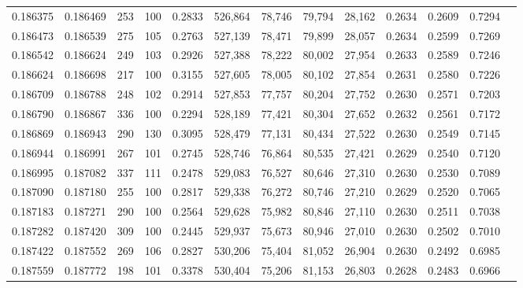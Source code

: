 \begin{tabular}{rrrrrrrrrrrrr}
0.186375 & 0.186469 &   253 & 100 &                                     0.2833 & 526,864 &  78,746 &  79,794 &  28,162 & 0.2634 & 0.2609 & 0.7294 \\
0.186473 & 0.186539 &   275 & 105 &                                     0.2763 & 527,139 &  78,471 &  79,899 &  28,057 & 0.2634 & 0.2599 & 0.7269 \\
0.186542 & 0.186624 &   249 & 103 &                                     0.2926 & 527,388 &  78,222 &  80,002 &  27,954 & 0.2633 & 0.2589 & 0.7246 \\
0.186624 & 0.186698 &   217 & 100 &                                     0.3155 & 527,605 &  78,005 &  80,102 &  27,854 & 0.2631 & 0.2580 & 0.7226 \\
0.186709 & 0.186788 &   248 & 102 &                                     0.2914 & 527,853 &  77,757 &  80,204 &  27,752 & 0.2630 & 0.2571 & 0.7203 \\
0.186790 & 0.186867 &   336 & 100 &                                     0.2294 & 528,189 &  77,421 &  80,304 &  27,652 & 0.2632 & 0.2561 & 0.7172 \\
0.186869 & 0.186943 &   290 & 130 &                                     0.3095 & 528,479 &  77,131 &  80,434 &  27,522 & 0.2630 & 0.2549 & 0.7145 \\
0.186944 & 0.186991 &   267 & 101 &                                     0.2745 & 528,746 &  76,864 &  80,535 &  27,421 & 0.2629 & 0.2540 & 0.7120 \\
0.186995 & 0.187082 &   337 & 111 &                                     0.2478 & 529,083 &  76,527 &  80,646 &  27,310 & 0.2630 & 0.2530 & 0.7089 \\
0.187090 & 0.187180 &   255 & 100 &                                     0.2817 & 529,338 &  76,272 &  80,746 &  27,210 & 0.2629 & 0.2520 & 0.7065 \\
0.187183 & 0.187271 &   290 & 100 &                                     0.2564 & 529,628 &  75,982 &  80,846 &  27,110 & 0.2630 & 0.2511 & 0.7038 \\
0.187282 & 0.187420 &   309 & 100 &                                     0.2445 & 529,937 &  75,673 &  80,946 &  27,010 & 0.2630 & 0.2502 & 0.7010 \\
0.187422 & 0.187552 &   269 & 106 &                                     0.2827 & 530,206 &  75,404 &  81,052 &  26,904 & 0.2630 & 0.2492 & 0.6985 \\
0.187559 & 0.187772 &   198 & 101 &                                     0.3378 & 530,404 &  75,206 &  81,153 &  26,803 & 0.2628 & 0.2483 & 0.6966 \\

\end{tabular}
